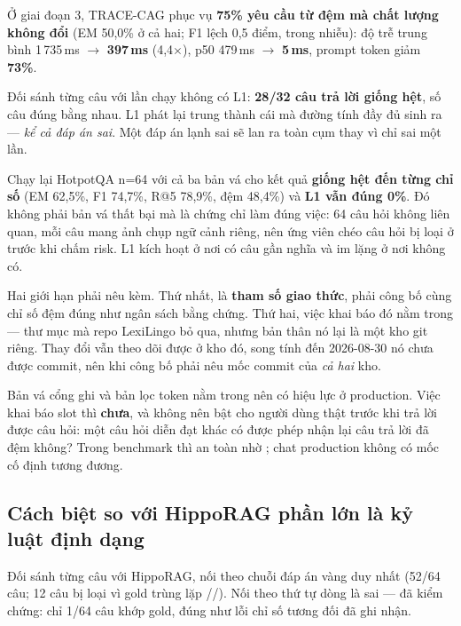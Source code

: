\begin{luuy}
Ở giai đoạn 3, TRACE-CAG phục vụ \textbf{75\% yêu cầu từ đệm mà chất lượng không đổi}
(EM 50,0\% ở cả hai; F1 lệch 0,5 điểm, trong nhiễu): độ trễ trung bình 1\,735\,ms $\to$
\textbf{397\,ms} (4,4$\times$), p50 479\,ms $\to$ \textbf{5\,ms}, prompt token giảm
\textbf{73\%}.

Đối sánh từng câu với lần chạy không có L1: \textbf{28/32 câu trả lời giống hệt}, số câu đúng
bằng nhau. L1 phát lại trung thành cái mà đường tính đầy đủ sinh ra --- \emph{kể cả đáp án
sai}. Một đáp án lạnh sai sẽ lan ra toàn cụm thay vì chỉ sai một lần.

Chạy lại HotpotQA n=64 với cả ba bản vá cho kết quả \textbf{giống hệt đến từng chỉ số}
(EM 62,5\%, F1 74,7\%, R@5 78,9\%, đệm 48,4\%) và \textbf{L1 vẫn đúng 0\%}. Đó không phải
bản vá thất bại mà là chứng chỉ làm đúng việc: 64 câu hỏi không liên quan, mỗi câu mang ảnh
chụp ngữ cảnh riêng, nên ứng viên chéo câu hỏi bị loại ở 
trước khi chấm risk. L1 kích hoạt ở nơi có câu gần nghĩa và im lặng ở nơi không có.
\end{luuy}

Hai giới hạn phải nêu kèm. Thứ nhất,  là \textbf{tham số giao thức},
phải công bố cùng chỉ số đệm đúng như ngân sách bằng chứng. Thứ hai, việc khai báo đó nằm
trong  --- thư mục mà repo LexiLingo bỏ qua, nhưng bản thân nó lại
là một kho git riêng. Thay đổi vẫn theo dõi được ở kho đó, song tính đến 2026-08-30 nó chưa
được commit, nên khi công bố phải nêu mốc commit của \emph{cả hai} kho.

Bản vá cổng ghi và bản lọc token nằm trong  nên có hiệu lực ở production. Việc
khai báo slot thì \textbf{chưa}, và không nên bật cho người dùng thật trước khi trả lời được
câu hỏi: một câu hỏi diễn đạt khác có được phép nhận lại câu trả lời đã đệm không? Trong
benchmark thì an toàn nhờ ; chat production không có mốc cố định tương
đương.

\subsection{Cách biệt so với HippoRAG phần lớn là kỷ luật định dạng}

Đối sánh từng câu với HippoRAG, nối theo chuỗi đáp án vàng duy nhất (52/64 câu; 12 câu bị
loại vì gold trùng lặp //). Nối theo thứ tự dòng là sai --- đã
kiểm chứng: chỉ 1/64 câu khớp gold, đúng như lỗi chỉ số tương đối đã ghi nhận.

